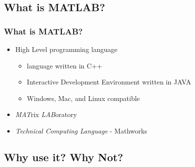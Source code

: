 \documentclass[fleqn]{beamer} %
\newcommand{\sectionIIsubsectionItitle}{What is MATLAB?}
\newcommand{\sectionIIsubsectionIItitle}{Why use it? Why Not?}
\begin{document}
		\subsection{\sectionIIsubsectionItitle}\label{sectionIIsubsectionI}

			\begin{frame}[label=sectionIIsubsectionI]
				\frametitle{\sectionIIsubsectionItitle}
				\bigskip

				\begin{itemize}
					\item High Level programming language
					\begin{itemize}
						\item language written in C++
						\item Interactive Development Environment written in JAVA 
						\item Windows, Mac, and Linux compatible
					\end{itemize}
					\item {\it MAT}rix {\it LAB}oratory
					\item {\it Technical Computing Language} - Mathworks
				\end{itemize}	

				\btVFill
			\end{frame}

		\subsection{\sectionIIsubsectionIItitle}\label{sectionIIsubsectionII}
\end{document}
